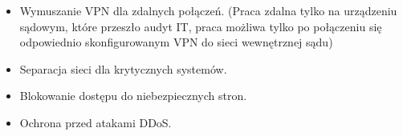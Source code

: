 \begin{itemize}
    \item Wymuszanie VPN dla zdalnych połączeń. (Praca zdalna tylko na urządzeniu sądowym, które przeszło audyt IT, praca możliwa tylko po połączeniu się odpowiednio skonfigurowanym VPN do sieci wewnętrznej sądu)
    \item Separacja sieci dla krytycznych systemów.
    \item Blokowanie dostępu do niebezpiecznych stron.
    \item Ochrona przed atakami DDoS.
\end{itemize}